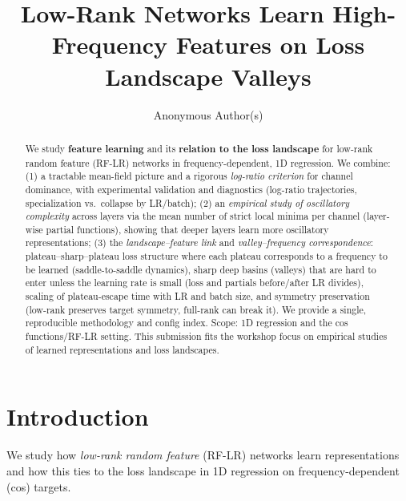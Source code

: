 \documentclass{article}
\title{Low-Rank Networks Learn High-Frequency Features on Loss Landscape Valleys}
\author{Anonymous Author(s)}
\theoremstyle{plain}
\theoremstyle{definition}
\begin{document}
\maketitle

\begin{abstract}
We study \textbf{feature learning} and its \textbf{relation to the loss landscape} for low-rank random feature (RF-LR) networks in frequency-dependent, 1D regression. We combine: (1) a tractable mean-field picture and a rigorous \emph{log-ratio criterion} for channel dominance, with experimental validation and diagnostics (log-ratio trajectories, specialization vs.\ collapse by LR/batch); (2) an \emph{empirical study of oscillatory complexity} across layers via the mean number of strict local minima per channel (layer-wise partial functions), showing that deeper layers learn more oscillatory representations; (3) the \emph{landscape--feature link} and \emph{valley--frequency correspondence}: plateau--sharp--plateau loss structure where each plateau corresponds to a frequency to be learned (saddle-to-saddle dynamics), sharp deep basins (valleys) that are hard to enter unless the learning rate is small (loss and partials before/after LR divides), scaling of plateau-escape time with LR and batch size, and symmetry preservation (low-rank preserves target symmetry, full-rank can break it). We provide a single, reproducible methodology and config index. Scope: 1D regression and the cos functions/RF-LR setting. This submission fits the workshop focus on empirical studies of learned representations and loss landscapes.
\end{abstract}

\section{Introduction}
\label{sec:intro}

We study how \emph{low-rank random feature} (RF-LR) networks learn representations and how this ties to the loss landscape \cite{chizat2018globalconvergencegradientdescent,abbe2023sgdlearningneuralnetworks} in 1D regression on frequency-dependent (cos) targets.
\end{document}
